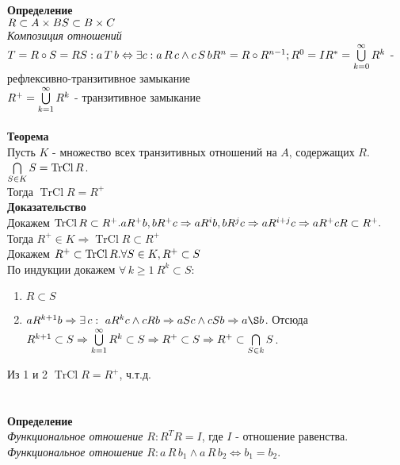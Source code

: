 \documentclass[12pt]{article}
\begin{document}
\textbf{Определение}\\
$R \subset A \times B\\
S \subset B \times C$\\
\textit{Композиция отношений} $T=R\circ S = RS: a\,T\,b \Leftrightarrow \exists c: a\,R\,c \land c\,S\,b\\
R^n = R\circ R^{n-1}; R^0=I\\
R^*=\bigcup\limits_{k=0}^\infty R^k$ - рефлексивно-транзитивное замыкание\\
$R^+=\bigcup\limits_{k=1}^\infty R^k$ - транзитивное замыкание\\\\
\textbf{Теорема}\\
Пусть $K$ - множество всех транзитивных отношений на $A$, содержащих $R$.\\
$\bigcap\limits_{S\in K}S = \operatorname{TrCl} R$.\\
Тогда $\operatorname{TrCl} R = R^+$\\
\textbf{Доказательство}\\
Докажем $\operatorname{TrCl} R \subset R^+.\\
a R^+ b, b R^+ c \Rightarrow a R^i b, b R^j c \Rightarrow a R^{i+j} c \Rightarrow a R^+ c\\
R \subset R^+.$\\
Тогда $R^+ \in K \Rightarrow \operatorname{TrCl} R \subset R^+$\\
Докажем $R^+ \subset \operatorname{TrCl} R.\\
\forall S \in K, R^+ \subset S$\\
По индукции докажем $\forall\,k\geq 1\ R^k\subset S:$\\
\begin{enumerate}
    \item $R \subset S$
    \item $a R^{k+1} b \Rightarrow \exists\,c:\ a R^k c \land c R b \Rightarrow a S c \land c S b \Rightarrow a \S b$. Отсюда $R^{k+1} \subset S \Rightarrow \bigcup\limits_{k=1}^\infty R^k \subset S \Rightarrow R^+ \subset S \Rightarrow R^+ \subset \bigcap\limits_{S \in k} S$.
\end{enumerate}
Из 1 и 2 $\operatorname{TrCl} R = R^+$, ч.т.д.\\\\\\
\textbf{Определение}\\
\textit{Функциональное отношение} $R: R^TR=I$, где $I$ - отношение равенства.\\
\textit{Функциональное отношение} $R: a\,R\,b_1 \land a\,R\,b_2 \Leftrightarrow b_1 = b_2$.\\\\
\end{document}
